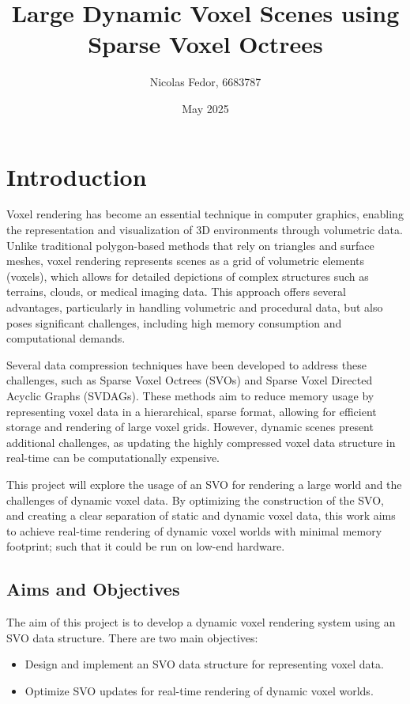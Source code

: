 \documentclass{article}
\title{Large Dynamic Voxel Scenes using Sparse Voxel Octrees}
\author{Nicolas Fedor, 6683787}
\date{May 2025}
\begin{document}
\maketitle

\section{Introduction}
Voxel rendering has become an essential technique in computer graphics, enabling the representation and visualization of 3D environments through volumetric data. Unlike traditional polygon-based methods that rely on triangles and surface meshes, voxel rendering represents scenes as a grid of volumetric elements (voxels), which allows for detailed depictions of complex structures such as terrains, clouds, or medical imaging data. This approach offers several advantages, particularly in handling volumetric and procedural data, but also poses significant challenges, including high memory consumption and computational demands.

Several data compression techniques have been developed to address these challenges, such as Sparse Voxel Octrees (SVOs) and Sparse Voxel Directed Acyclic Graphs (SVDAGs). These methods aim to reduce memory usage by representing voxel data in a hierarchical, sparse format, allowing for efficient storage and rendering of large voxel grids. However, dynamic scenes present additional challenges, as updating the highly compressed voxel data structure in real-time can be computationally expensive.

This project will explore the usage of an SVO for rendering a large world and the challenges of dynamic voxel data. By optimizing the construction of the SVO, and creating a clear separation of static and dynamic voxel data, this work aims to achieve real-time rendering of dynamic voxel worlds with minimal memory footprint; such that it could be run on low-end hardware.

\subsection{Aims and Objectives}
The aim of this project is to develop a dynamic voxel rendering system using an SVO data structure. There are two main objectives:

\begin{itemize}
    \item Design and implement an SVO data structure for representing voxel data.
    \item Optimize SVO updates for real-time rendering of dynamic voxel worlds.
\end{itemize}
\end{document}
